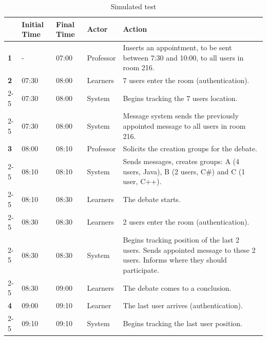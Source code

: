 \documentclass[5p,authoryear]{elsarticle}
\begin{document}
\begin{table}
  \footnotesize
  \begin{tabular}{p{0.12cm}p{0.45cm}p{0.45cm}p{1cm}p{5cm}}
    \toprule
    & Initial Time & Final Time & Actor & Action \\
    \midrule
    \textbf{1} & - & 07:00 & Professor & Inserts an appointment, to be sent between 7:30 and 10:00, to all users in room 216. \\
    \midrule
    \textbf{2} & 07:30 & 08:00 & Learners & 7 users enter the room (authentication). \\
    \cmidrule(r){2-5}
    & 07:30 & 08:00 & System & Begins tracking the 7 users location. \\
    \cmidrule(r){2-5}
    & 07:30 & 08:00 & System & Message system sends the previously appointed message to all users in room 216. \\
    \midrule
    \textbf{3} & 08:00 & 08:10 & Professor & Solicits the creation groups for the debate. \\
    \cmidrule(r){2-5}
    & 08:10 & 08:10 & System & Sends messages, creates groups: A (4 users, Java), B (2 users, C\#) and C (1 user, C++). \\  
    \cmidrule(r){2-5}
    & 08:10 & 08:30 & Learners & The debate starts. \\
    \cmidrule(r){2-5}
    & 08:30 & 08:30 & Learners & 2 users enter the room (authentication).  \\
    \cmidrule(r){2-5}
    & 08:30 & 08:30 & System & Begins tracking position of the last 2 users. Sends appointed message to these 2 users. Informs where they should participate. \\  
    \cmidrule(r){2-5}
    & 08:30 & 09:00 & Learners & The debate comes to a conclusion. \\
    \midrule
    \textbf{4} & 09:00 & 09:10 & Learner & The last user arrives (authentication). \\  
    \cmidrule(r){2-5}
    & 09:10 & 09:10 & System & Begins tracking the last user position. \\
    \bottomrule
  \end{tabular}
  \caption{Simulated test}
  \label{tab:simulated}
\end{table}
\end{document}
